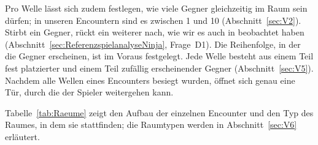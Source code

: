 \documentclass[../Main.tex]{subfiles}
\begin{document}
Pro Welle lässt sich zudem festlegen, wie viele Gegner gleichzeitig im Raum sein dürfen; in unseren Encountern sind es zwischen 1 und 10 (Abschnitt~\ref{sec:V2}). Stirbt ein Gegner, rückt ein weiterer nach, wie wir es auch in  beobachtet haben (Abschnitt~\ref{sec:ReferenzspielanalyseNinja}, Frage~D1). Die Reihenfolge, in der die Gegner erscheinen, ist im Voraus festgelegt. Jede Welle besteht aus einem Teil fest platzierter und einem Teil zufällig erscheinender Gegner (Abschnitt~\ref{sec:V5}). Nachdem alle Wellen eines Encounters besiegt wurden, öffnet sich genau eine Tür, durch die der Spieler weitergehen kann.

Tabelle~\ref{tab:Raeume} zeigt den Aufbau der einzelnen Encounter und den Typ des Raumes, in dem sie stattfinden; die Raumtypen werden in Abschnitt~\ref{sec:V6} erläutert.
\end{document}

